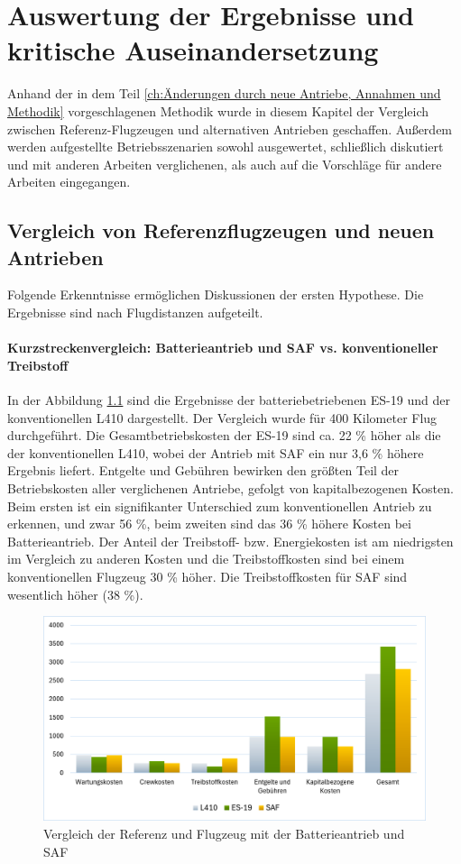 \chapter{Auswertung der Ergebnisse und kritische Auseinandersetzung}
\label{ch:Auswertung der Ergebnisse}
Anhand der in dem Teil \ref{ch:Änderungen durch neue Antriebe, Annahmen und Methodik} 
vorgeschlagenen Methodik wurde in diesem Kapitel der Vergleich zwischen 
Referenz-Flugzeugen und alternativen Antrieben geschaffen.
Außerdem werden aufgestellte Betriebsszenarien sowohl ausgewertet, 
schließlich diskutiert und mit anderen Arbeiten verglichenen, 
als auch auf die Vorschläge für andere Arbeiten eingegangen.

\section{Vergleich von Referenzflugzeugen und neuen Antrieben}
\label{s:Ergebnisse_Flugzeuge}
Folgende Erkenntnisse ermöglichen Diskussionen der ersten Hypothese. 
Die Ergebnisse sind nach Flugdistanzen aufgeteilt.\\
%
\subsubsection{Kurzstreckenvergleich: Batterieantrieb und SAF vs. konventioneller Treibstoff}
%
In der Abbildung \ref{vergleichBA_Ref} sind die Ergebnisse der 
batteriebetriebenen ES-19 und der konventionellen L410 dargestellt.
Der Vergleich wurde für 400 Kilometer Flug durchgeführt.
%
Die Gesamtbetriebskosten der ES-19 sind ca. 22 \% höher als die der konventionellen L410, 
wobei der Antrieb mit SAF ein nur 3,6 \% höhere Ergebnis liefert. 
Entgelte und Gebühren bewirken den größten Teil der Betriebskosten aller verglichenen Antriebe, 
gefolgt von kapitalbezogenen Kosten. 
Beim ersten ist ein signifikanter Unterschied zum konventionellen Antrieb zu erkennen, 
und zwar 56 \%, beim zweiten sind das 36 \% höhere Kosten bei Batterieantrieb. 
Der Anteil der Treibstoff- bzw. Energiekosten ist am niedrigsten im Vergleich zu anderen Kosten 
und die Treibstoffkosten sind bei einem konventionellen Flugzeug 30 \% höher. 
Die Treibstoffkosten für SAF sind wesentlich höher (38 \%).

\begin{figure}[h]
	\centering
	\includegraphics[width=0.9\linewidth]{Bilder/VergleichBA_Ref.png}
	\caption[Betriebskosten]{Vergleich der Referenz und Flugzeug mit der Batterieantrieb und SAF}
	\label{vergleichBA_Ref}
\end{figure}

